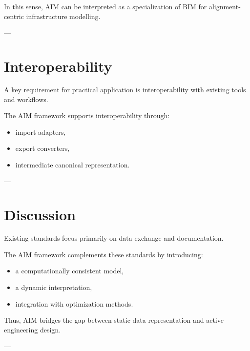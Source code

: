 \begin{remark}
In this sense, AIM can be interpreted as a specialization of BIM for
alignment-centric infrastructure modelling.
\end{remark}

---

\section{Interoperability}

\begin{remark}
A key requirement for practical application is interoperability with
existing tools and workflows.
\end{remark}

\begin{remark}
The AIM framework supports interoperability through:
\begin{itemize}
\item import adapters,
\item export converters,
\item intermediate canonical representation.
\end{itemize}
\end{remark}

---

\section{Discussion}

\begin{remark}
Existing standards focus primarily on data exchange and documentation.
\end{remark}

\begin{remark}
The AIM framework complements these standards by introducing:
\begin{itemize}
\item a computationally consistent model,
\item a dynamic interpretation,
\item integration with optimization methods.
\end{itemize}
\end{remark}

\begin{remark}
Thus, AIM bridges the gap between static data representation and active
engineering design.
\end{remark}

---

